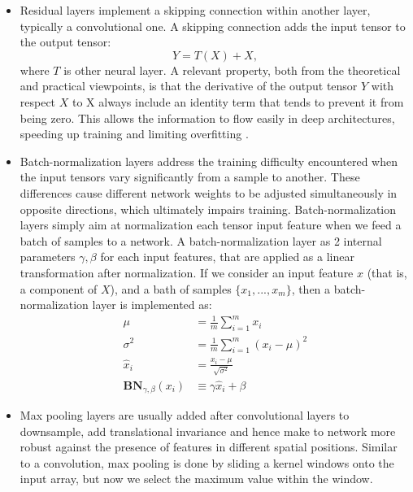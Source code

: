 \begin{itemize}
    \item Residual layers implement a skipping connection within another layer, typically a convolutional one. A skipping connection adds the input tensor to the output tensor:
    \begin{equation}
        Y=T(X)+X,
    \end{equation}
    where $T$ is other neural layer. A relevant property, both from the theoretical and practical viewpoints, is that the derivative of the output tensor $Y$ with respect $X$ to X always include an identity term that tends to prevent it from being zero. This allows the information to flow easily in deep architectures, speeding up training and limiting overfitting \cite{residual_paper}.
    \item Batch-normalization layers \cite{ioffe2015batch} address the training difficulty encountered when the input tensors vary significantly from a sample to another. These differences cause different network weights to be adjusted simultaneously in opposite directions, which ultimately impairs training. Batch-normalization layers simply aim at normalization each tensor input feature when we feed a batch of samples to a network. A batch-normalization layer as 2 internal parameters $\gamma,\beta$ for each input features, that are applied as a linear transformation after normalization. If we consider an input feature $x$ (that is, a component of $X$), and a bath of samples $\{x_1,...,x_m \}$, then a batch-normalization layer is implemented as:
    \begin{equation}
        \begin{aligned}
            \mu& =\frac1m\sum_{i=1}^mx_i  \\
            \sigma^2& =\frac1m\sum_{i=1}^m(x_i-\mu)^2  \\
            \widehat{x}_i& =\frac{x_i-\mu}{\sqrt{\sigma^2}}  \\
            \mathbf{BN}_{\gamma,\beta}(x_i)&\equiv \gamma\widehat{x}_i+\beta
            \end{aligned}
    \end{equation}
    


    \item Max pooling layers are usually added after convolutional layers to downsample, add translational invariance and hence make to network more robust against the presence of features in different spatial positions. Similar to a convolution, max pooling is done by sliding a kernel windows onto the input array, but now we select the maximum value within the window.
\end{itemize}

